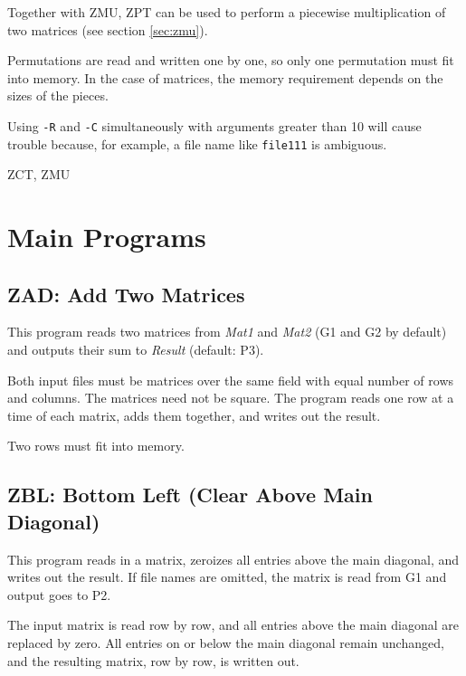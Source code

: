 Together with ZMU, ZPT can be used to perform a piecewise
multiplication of two matrices (see section \ref{sec:zmu}).


\Limits
Permutations are read and written one by one, so only one
permutation must fit into memory. In the case of matrices, the
memory requirement depends on the sizes of the pieces.

\Bugs
Using {\tt -R} and {\tt -C} simultaneously with arguments greater than
10 will cause trouble because, for example, a file name like
{\tt file111} is ambiguous.


\SeeAlso
ZCT, ZMU




\section{Main Programs}


\subsection{ZAD: Add Two Matrices}

\Syntax
{}

\Description
This program reads two matrices from {\em Mat1} and {\em Mat2}
(G1 and G2 by default) and outputs their sum to {\em Result}
(default: P3).

Both input files must be matrices over the same field with equal
number of rows and columns. The matrices need not be square.
The program reads one row at a time of each matrix, adds them
together, and writes out the result.

\Limits
Two rows must fit into memory.



\subsection{ZBL: Bottom Left (Clear Above Main Diagonal)}
\Syntax
{}

\Description
This program reads in a matrix, zeroizes all entries above the
main diagonal, and writes out the result. If file names are omitted,
the matrix is read from G1 and output goes to P2.

The input matrix is read row by row, and all entries above the main
diagonal are replaced by zero. All entries on or below the main
diagonal remain unchanged, and the resulting matrix, row by row, is
written out.

